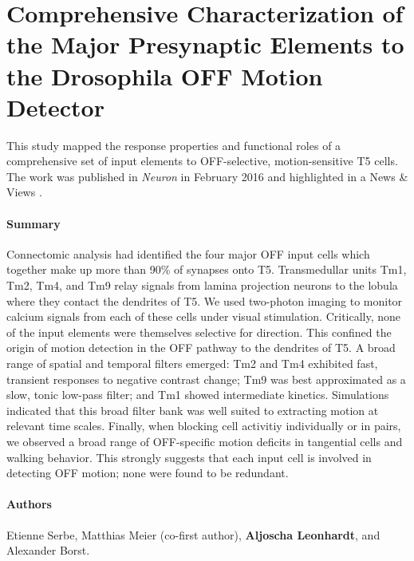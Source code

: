 \section[Comprehensive Characterization of the Major Presynaptic Elements to the \textit{Drosophila} OFF Motion Detector]{Comprehensive Characterization of the Major Presynaptic Elements to the Drosophila OFF Motion Detector}
\label{sct:manuscript_serbe}

This study mapped the response properties and functional roles of a comprehensive set of input elements to OFF-selective, motion-sensitive T5 cells. The work was published in \textit{Neuron} in February 2016 \citep{Serbe:2016ew} and highlighted in a News \& Views \citep{Tuthill:2016aa}.

\paragraph{Summary}
Connectomic analysis had identified the four major OFF input cells which together make up more than 90\% of synapses onto T5. Transmedullar units Tm1, Tm2, Tm4, and Tm9 relay signals from lamina projection neurons to the lobula where they contact the dendrites of T5. We used two-photon imaging to monitor calcium signals from each of these cells under visual stimulation. Critically, none of the input elements were themselves selective for direction. This confined the origin of motion detection in the OFF pathway to the dendrites of T5. A broad range of spatial and temporal filters emerged: Tm2 and Tm4 exhibited fast, transient responses to negative contrast change; Tm9 was best approximated as a slow, tonic low-pass filter; and Tm1 showed intermediate kinetics. Simulations indicated that this broad filter bank was well suited to extracting motion at relevant time scales. Finally, when blocking cell activitiy individually or in pairs, we observed a broad range of OFF-specific motion deficits in tangential cells and walking behavior. This strongly suggests that each input cell is involved in detecting OFF motion; none were found to be redundant.

\paragraph{Authors} Etienne Serbe, Matthias Meier (co-first author), \textbf{Aljoscha Leonhardt}, and Alexander Borst.

